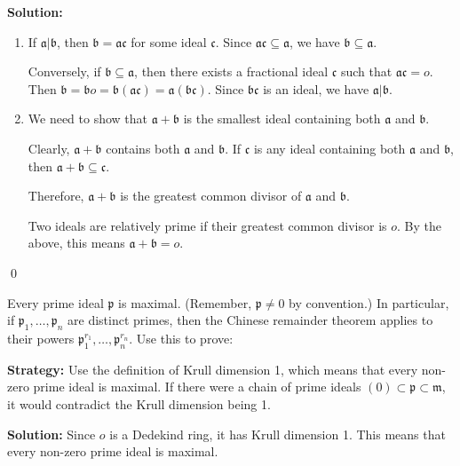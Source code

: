 \noindent\textbf{Solution:}
\begin{enumerate}[label=(\alph*)]
    \item If $\mathfrak{a} | \mathfrak{b}$, then $\mathfrak{b} = \mathfrak{a}\mathfrak{c}$ for some ideal $\mathfrak{c}$. Since $\mathfrak{a}\mathfrak{c} \subseteq \mathfrak{a}$, we have $\mathfrak{b} \subseteq \mathfrak{a}$.
    
    Conversely, if $\mathfrak{b} \subseteq \mathfrak{a}$, then there exists a fractional ideal $\mathfrak{c}$ such that $\mathfrak{a}\mathfrak{c} = o$. Then $\mathfrak{b} = \mathfrak{b}o = \mathfrak{b}(\mathfrak{a}\mathfrak{c}) = \mathfrak{a}(\mathfrak{b}\mathfrak{c})$. Since $\mathfrak{b}\mathfrak{c}$ is an ideal, we have $\mathfrak{a} | \mathfrak{b}$.
    
    \item We need to show that $\mathfrak{a} + \mathfrak{b}$ is the smallest ideal containing both $\mathfrak{a}$ and $\mathfrak{b}$.
    
    Clearly, $\mathfrak{a} + \mathfrak{b}$ contains both $\mathfrak{a}$ and $\mathfrak{b}$. If $\mathfrak{c}$ is any ideal containing both $\mathfrak{a}$ and $\mathfrak{b}$, then $\mathfrak{a} + \mathfrak{b} \subseteq \mathfrak{c}$.
    
    Therefore, $\mathfrak{a} + \mathfrak{b}$ is the greatest common divisor of $\mathfrak{a}$ and $\mathfrak{b}$.
    
    Two ideals are relatively prime if their greatest common divisor is $o$. By the above, this means $\mathfrak{a} + \mathfrak{b} = o$.
\end{enumerate}


\qed
\begin{problembox}
Every prime ideal $\mathfrak{p}$ is maximal. (Remember, $\mathfrak{p} \neq 0$ by convention.) In particular, if $\mathfrak{p}_1, \ldots, \mathfrak{p}_n$ are distinct primes, then the Chinese remainder theorem applies to their powers $\mathfrak{p}_1^{r_1}, \ldots, \mathfrak{p}_n^{r_n}$. Use this to prove:
\end{problembox}

\noindent\textbf{Strategy:} Use the definition of Krull dimension 1, which means that every non-zero prime ideal is maximal. If there were a chain of prime ideals $(0) \subset \mathfrak{p} \subset \mathfrak{m}$, it would contradict the Krull dimension being 1.

\noindent\textbf{Solution:}
Since $o$ is a Dedekind ring, it has Krull dimension 1. This means that every non-zero prime ideal is maximal.

